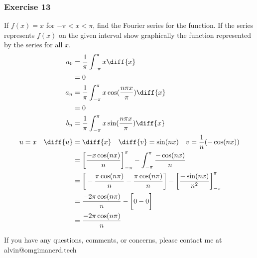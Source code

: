 \documentclass{math}
\begin{document}
\subsubsection*{Exercise 13}
If \( f(x) = x \) for \( -\pi<x<\pi \), find the Fourier series for the
function. If the series represents \( f(x) \) on the given interval show
graphically the function represented by the series for all \( x \).
\begin{align*}
  a_0 &= \frac{1}{\pi}\int_{-\pi}^{\pi}x\diff{x} \\
  &= 0 \\
  a_n &= \frac{1}{\pi}\int_{-\pi}^{\pi}x\cos(\frac{n\pi x}{\pi})\diff{x} \\
  &= 0 \\
  b_n &= \frac{1}{\pi}\int_{-\pi}^{\pi}x\sin(\frac{n\pi x}{\pi})\diff{x} \\
  u = x \quad \diff{u} &= \diff{x} \quad \diff{v} = \sin(nx) \quad
    v = \frac{1}{n}(-\cos(nx)) \\
  &= \bigg[\frac{-x\cos(nx)}{n}\bigg]_{-\pi}^{\pi}-
    \int_{-\pi}^{\pi}\frac{-\cos(nx)}{n} \\
  &= \bigg[-\frac{\pi\cos(n\pi)}{n}-\frac{\pi\cos(n\pi)}{n}\bigg]-
    \bigg[\frac{-\sin(nx)}{n^2}\bigg]_{-\pi}^{\pi} \\
  &= \frac{-2\pi\cos(n\pi)}{n}-\bigg[0-0\bigg] \\
  &= \frac{-2\pi\cos(n\pi)}{n}
\end{align*}
\begin{center}
\end{center}

\begin{center}
  If you have any questions, comments, or concerns, please contact me at
  alvin@omgimanerd.tech
\end{center}
\end{document}
